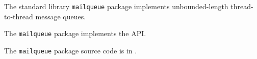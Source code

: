 
The standard library {\tt mailqueue} package implements unbounded-length thread-to-thread message queues.

The {\tt mailqueue} package implements the  API.

The {\tt mailqueue} package source code is in .



